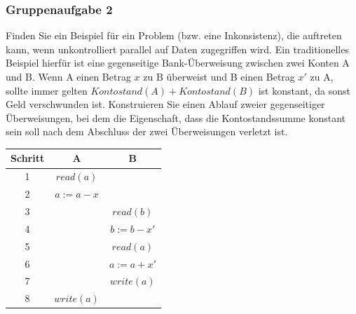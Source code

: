 \begin{frame}
	\frametitle{Gruppenaufgabe 2}
	\vspace{0.25cm}

	Finden Sie ein Beispiel für ein Problem (bzw. eine Inkonsistenz),
	die auftreten kann, wenn unkontrolliert parallel auf Daten zugegriffen wird.
	Ein traditionelles Beispiel hierfür ist eine gegenseitige Bank-Überweisung zwischen zwei
	Konten A und B. Wenn A einen Betrag \( x \) zu B überweist und B einen Betrag \( x' \)
	zu A, sollte immer gelten \( Kontostand(A) + Kontostand(B) \) ist konstant,
	da sonst Geld verschwunden ist.
	Konstruieren Sie einen Ablauf zweier gegenseitiger Überweisungen,
	bei dem die Eigenschaft, dass die Kontostandssumme konstant sein soll nach dem
	Abschluss der zwei Überweisungen verletzt ist.

	\pause
	\begin{table}[]
		\color{TUMBlau}
		\begin{tabular}{c|c|c}
			Schritt & A                & B                 \\ \hline
			1       & \( read(a) \)    &                   \\
			2       & \( a := a - x \) &                   \\
			3       &                  & \( read(b) \)     \\
			4       &                  & \( b := b - x' \) \\
			5       &                  & \( read(a) \)     \\
			6       &                  & \( a := a + x' \) \\
			7       &                  & \( write(a) \)    \\
			8       & \( write(a) \)   &                   \\
		\end{tabular}
	\end{table}

\end{frame}
